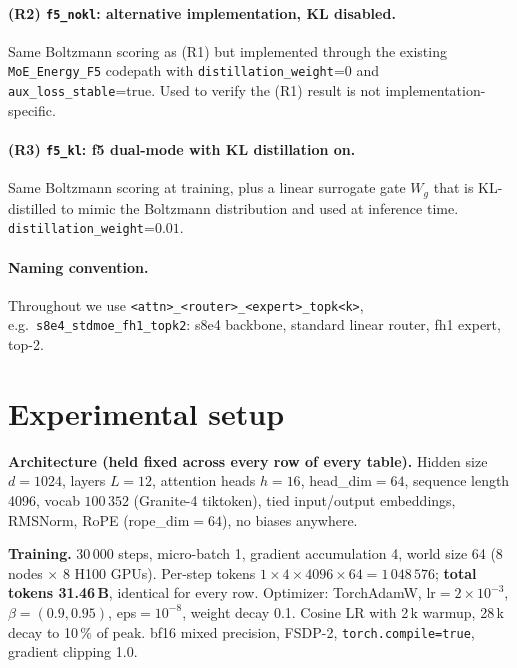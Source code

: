 \documentclass[oneside]{article}
\begin{document}
\paragraph{(R2) \texttt{f5\_nokl}: alternative implementation, KL disabled.}
Same Boltzmann scoring as (R1) but implemented through the existing
\texttt{MoE\_Energy\_F5} codepath with \texttt{distillation\_weight}=0
and \texttt{aux\_loss\_stable}=true. Used to verify the (R1) result is
not implementation-specific.

\paragraph{(R3) \texttt{f5\_kl}: f5 dual-mode with KL distillation on.}
Same Boltzmann scoring at training, plus a linear surrogate gate $W_g$
that is KL-distilled to mimic the Boltzmann distribution and used at
inference time. \texttt{distillation\_weight}=$0.01$.

\paragraph{Naming convention.}
Throughout we use
\texttt{<attn>\_<router>\_<expert>\_topk<k>}, e.g.\
\texttt{s8e4\_stdmoe\_fh1\_topk2}: s8e4 backbone, standard linear
router, fh1 expert, top-2.


\section{Experimental setup}
\label{sec:setup}

\textbf{Architecture (held fixed across every row of every table).}
Hidden size $d=1024$, layers $L=12$, attention heads $h=16$,
head\_dim$=64$, sequence length 4096, vocab $100\,352$ (Granite-4
tiktoken), tied input/output embeddings, RMSNorm, RoPE
(rope\_dim$=64$), no biases anywhere.

\textbf{Training.}
30\,000 steps, micro-batch 1, gradient accumulation 4, world size 64
(8 nodes $\times$ 8 H100 GPUs). Per-step tokens
$1{\times}4{\times}4096{\times}64=1\,048\,576$;
\textbf{total tokens 31.46\,B}, identical for every row.
Optimizer: TorchAdamW, lr$=2{\times}10^{-3}$, $\beta=(0.9,0.95)$,
eps$=10^{-8}$, weight decay 0.1. Cosine LR with 2\,k warmup, 28\,k
decay to 10\,\% of peak. bf16 mixed precision, FSDP-2,
\texttt{torch.compile=true}, gradient clipping 1.0.
\end{document}
